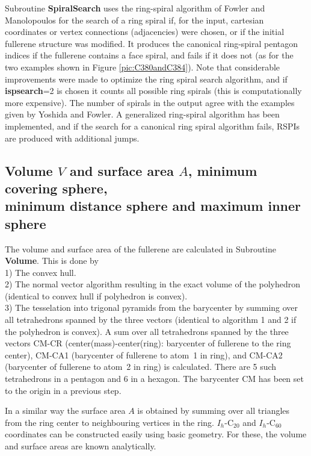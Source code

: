\documentclass[article,a4paper,twoside]{memoir}
\newcommand{\C}[1]{\ensuremath{\mathrm{C}_{#1}}}
\newcommand{\funname}[1]{{\color{blue}\textbf{#1}}}
\newcommand{\paramname}[1]{{\color{green}\textbf{#1}}}
\begin{document}
Subroutine \funname{SpiralSearch} uses the ring-spiral algorithm of Fowler and Manolopoulos \cite{Atlas}
for the search of a ring spiral if, for the input, cartesian coordinates or vertex connections (adjacencies) were chosen, or if the
initial fullerene structure was modified. It produces the canonical ring-spiral pentagon indices
if the fullerene contains a face spiral, and fails if it does not (as for the two examples shown in 
Figure \ref{pic:C380andC384}). Note that considerable improvements were made to optimize the ring spiral search algorithm, and if 
\paramname{ispsearch}=2 is chosen it counts all possible ring spirals (this is computationally more expensive). 
The number of spirals in the output agree with the examples given by Yoshida and Fowler.\cite{Yoshida97a} 
A generalized ring-spiral algorithm has been implemented, and if the search for a canonical ring spiral algorithm fails, RSPIs are produced with additional jumps.


\subsection{Volume $V$ and surface area $A$, minimum covering sphere, \\ minimum distance sphere and maximum inner sphere}
The volume and surface area of the fullerene are calculated in Subroutine \funname{Volume}. This is done by\\
1) The convex hull.\\
2) The normal vector algorithm resulting in the exact volume of the polyhedron (identical to convex hull if polyhedron is convex).\\
3) The tesselation into trigonal pyramids from the barycenter by summing over all tetrahedrons spanned
by the three vectors (identical to algorithm 1 and 2 if the polyhedron is convex).  A sum over all
tetrahedrons spanned by the three vectors CM-CR (center(mass)-center(ring): barycenter of fullerene to the ring center),
CM-CA1 (barycenter of fullerene to atom~1 in ring), and CM-CA2 (barycenter of fullerene  to atom~2 in ring) is calculated.
There are 5 such tetrahedrons in a pentagon and 6 in a hexagon.  The barycenter CM has been set to the origin in a previous step.

In a similar way the surface area $A$ is obtained by summing over all triangles from the ring center to
neighbouring vertices in the ring. $I_h$-\C{20} and $I_h$-\C{60} coordinates can be constructed easily
using basic geometry. For these, the volume and surface areas are known analytically.
\end{document}
